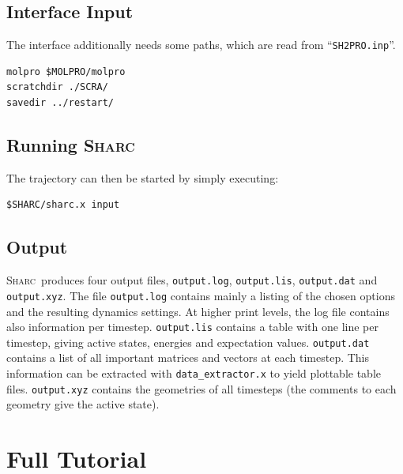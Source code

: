 \documentclass[a4paper,11pt,DIV=15,openany]{scrbook}
\newcommand{\sharc}{\textsc{Sharc}}
\newcommand{\ttt}[1]{\texttt{#1}}
\begin{document}
\section{Interface Input}

The interface additionally needs some paths, which are read from ``\ttt{SH2PRO.inp}''.
\begin{shaded}\vspace{-8mm}
\begin{verbatim}
molpro $MOLPRO/molpro
scratchdir ./SCRA/
savedir ../restart/
\end{verbatim}\vspace{-5mm}
\end{shaded}

\section{Running \sharc}

The trajectory can then be started by simply executing:
\begin{shaded}\vspace{-8mm}
\begin{verbatim}
$SHARC/sharc.x input 
\end{verbatim}\vspace{-5mm}
\end{shaded}

\section{Output}

\sharc\ produces four output files, \ttt{output.log}, \ttt{output.lis}, \ttt{output.dat} and \ttt{output.xyz}. The file \ttt{output.log} contains mainly a listing of the chosen options and the resulting dynamics settings. At higher print levels, the log file contains also information per timestep. \ttt{output.lis} contains a table with one line per timestep, giving active states, energies and expectation values. \ttt{output.dat} contains a list of all important matrices and vectors at each timestep. This information can be extracted with \ttt{data\_extractor.x} to yield plottable table files. \ttt{output.xyz} contains the geometries of all timesteps (the comments to each geometry give the active state).





\chapter{Full Tutorial}\label{chap:full}
\end{document}
